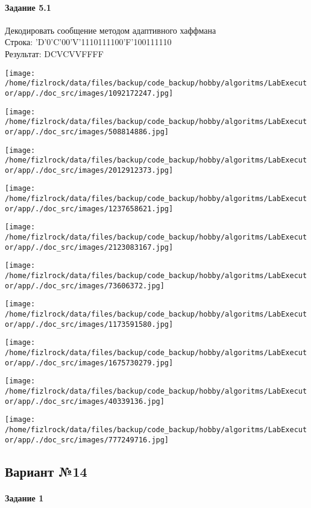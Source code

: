 \documentclass[a4paper, 12pt]{article}
\begin{document}
\paragraph{Задание 5.1 \\
}

Декодировать сообщение методом адаптивного хаффмана \\
Строка: 
'D'0'C'00'V'1110111100'F'100111110\\
Результат: DCVCVVFFFF

\texttt{[image: /home/fizlrock/data/files/backup/code\_backup/hobby/algoritms/LabExecutor/app/./doc\_src/images/1092172247.jpg]}

\texttt{[image: /home/fizlrock/data/files/backup/code\_backup/hobby/algoritms/LabExecutor/app/./doc\_src/images/508814886.jpg]}

\texttt{[image: /home/fizlrock/data/files/backup/code\_backup/hobby/algoritms/LabExecutor/app/./doc\_src/images/2012912373.jpg]}

\texttt{[image: /home/fizlrock/data/files/backup/code\_backup/hobby/algoritms/LabExecutor/app/./doc\_src/images/1237658621.jpg]}

\texttt{[image: /home/fizlrock/data/files/backup/code\_backup/hobby/algoritms/LabExecutor/app/./doc\_src/images/2123083167.jpg]}

\texttt{[image: /home/fizlrock/data/files/backup/code\_backup/hobby/algoritms/LabExecutor/app/./doc\_src/images/73606372.jpg]}

\texttt{[image: /home/fizlrock/data/files/backup/code\_backup/hobby/algoritms/LabExecutor/app/./doc\_src/images/1173591580.jpg]}

\texttt{[image: /home/fizlrock/data/files/backup/code\_backup/hobby/algoritms/LabExecutor/app/./doc\_src/images/1675730279.jpg]}

\texttt{[image: /home/fizlrock/data/files/backup/code\_backup/hobby/algoritms/LabExecutor/app/./doc\_src/images/40339136.jpg]}

\texttt{[image: /home/fizlrock/data/files/backup/code\_backup/hobby/algoritms/LabExecutor/app/./doc\_src/images/777249716.jpg]}
\pagebreak
\subsection{Вариант №14}
\paragraph{Задание 1}
\end{document}
